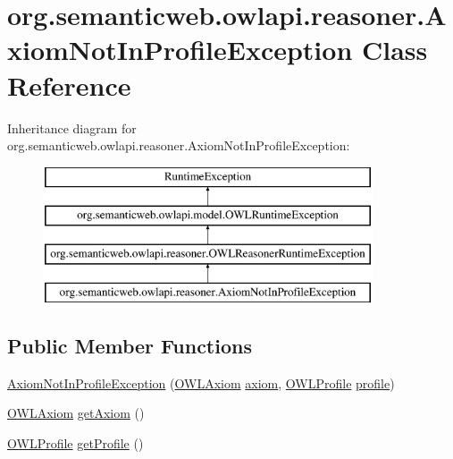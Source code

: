 \hypertarget{classorg_1_1semanticweb_1_1owlapi_1_1reasoner_1_1_axiom_not_in_profile_exception}{\section{org.\-semanticweb.\-owlapi.\-reasoner.\-Axiom\-Not\-In\-Profile\-Exception Class Reference}
\label{classorg_1_1semanticweb_1_1owlapi_1_1reasoner_1_1_axiom_not_in_profile_exception}
}
Inheritance diagram for org.\-semanticweb.\-owlapi.\-reasoner.\-Axiom\-Not\-In\-Profile\-Exception\-:\begin{figure}[H]
\begin{center}
\leavevmode
\includegraphics[height=4.000000cm]{classorg_1_1semanticweb_1_1owlapi_1_1reasoner_1_1_axiom_not_in_profile_exception}
\end{center}
\end{figure}
\subsection*{Public Member Functions}
\begin{DoxyCompactItemize}
\item 
\hyperlink{classorg_1_1semanticweb_1_1owlapi_1_1reasoner_1_1_axiom_not_in_profile_exception_a34ea486e5ef0e2ca1560583a52e50374}{Axiom\-Not\-In\-Profile\-Exception} (\hyperlink{interfaceorg_1_1semanticweb_1_1owlapi_1_1model_1_1_o_w_l_axiom}{O\-W\-L\-Axiom} \hyperlink{classorg_1_1semanticweb_1_1owlapi_1_1reasoner_1_1_axiom_not_in_profile_exception_ae6e3e5be0835bbc8d96e11ceef0a3663}{axiom}, \hyperlink{interfaceorg_1_1semanticweb_1_1owlapi_1_1profiles_1_1_o_w_l_profile}{O\-W\-L\-Profile} \hyperlink{classorg_1_1semanticweb_1_1owlapi_1_1reasoner_1_1_axiom_not_in_profile_exception_aeb7d1f8593b50e6438679554d8137836}{profile})
\item 
\hyperlink{interfaceorg_1_1semanticweb_1_1owlapi_1_1model_1_1_o_w_l_axiom}{O\-W\-L\-Axiom} \hyperlink{classorg_1_1semanticweb_1_1owlapi_1_1reasoner_1_1_axiom_not_in_profile_exception_a7d2e2a1e75d71d6c8cdf63949f7b14fe}{get\-Axiom} ()
\item 
\hyperlink{interfaceorg_1_1semanticweb_1_1owlapi_1_1profiles_1_1_o_w_l_profile}{O\-W\-L\-Profile} \hyperlink{classorg_1_1semanticweb_1_1owlapi_1_1reasoner_1_1_axiom_not_in_profile_exception_a5b2dfb1c7c115d62d5d238d824002d72}{get\-Profile} ()
\end{DoxyCompactItemize}
